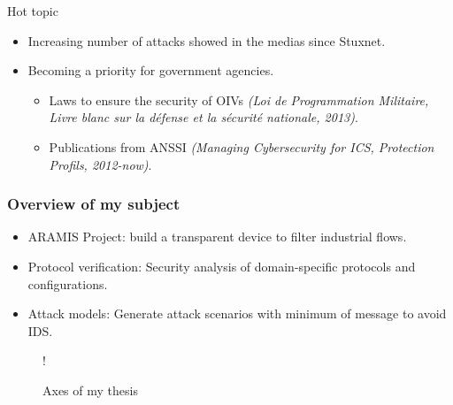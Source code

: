 \documentclass{beamer}
\begin{document}
\begin{frame}
\begin{columns}
\begin{column}{.3\textwidth}
{            }
        \end{column}
        \begin{column}{.3\textwidth}
        \end{column}
    \end{columns}
    
    \begin{block}{Hot topic}
        \begin{itemize}
            \item Increasing number of attacks showed in the medias since Stuxnet.
            \item Becoming a priority for government agencies.
            \begin{itemize}
                \item Laws to ensure the security of OIVs {\em (Loi de Programmation Militaire, Livre blanc sur la défense et la sécurité nationale, 2013)}.
                \item Publications from ANSSI {\em (Managing Cybersecurity for ICS, Protection Profils, 2012-now)}.
            \end{itemize}
        \end{itemize}
    \end{block}
\end{frame}

\begin{frame}
    \frametitle{Overview of my subject}
    
    \begin{itemize}
        \item ARAMIS Project: build a transparent device to filter industrial flows.
        \item Protocol verification: Security analysis of domain-specific protocols and configurations.
        \item Attack models: Generate attack scenarios with minimum of message to avoid IDS.
    \end{itemize}

    \begin{figure}[htb]
        \centering
         {!} {
            
        }
        \caption{Axes of my thesis}
    \end{figure}
\end{frame}
\end{document}
